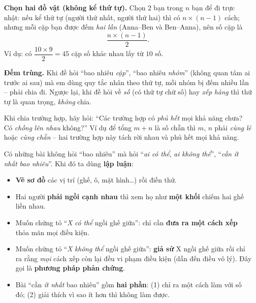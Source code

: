 \begin{knowbox}
\textbf{Chọn hai đồ vật (không kể thứ tự).} Chọn $2$ bạn trong $n$ bạn để đi trực nhật: nếu kể thứ tự (người thứ nhất, người thứ hai) thì có $n\times(n-1)$ cách; nhưng mỗi cặp bạn được đếm \emph{hai lần} (Anna--Ben và Ben--Anna), nên số cặp là
\[
\frac{n\times(n-1)}{2}.
\]
Ví dụ: có $\dfrac{10\times9}{2}=45$ cặp số khác nhau lấy từ $10$ số.
\end{knowbox}

\begin{warnbox}
\textbf{Đếm trùng.} Khi đề hỏi ``bao nhiêu \emph{cặp}'', ``bao nhiêu \emph{nhóm}'' (không quan tâm ai trước ai sau) mà em dùng quy tắc nhân theo thứ tự, mỗi nhóm bị đếm nhiều lần -- phải chia đi. Ngược lại, khi đề hỏi về \emph{số} (có thứ tự chữ số) hay \emph{xếp hàng} thì thứ tự là quan trọng, \emph{không} chia.
\end{warnbox}

\begin{tipbox}
Khi chia trường hợp, hãy hỏi: ``Các trường hợp có \emph{phủ hết} mọi khả năng chưa? Có \emph{chồng lên nhau} không?'' Ví dụ để tổng $m+n$ là số chẵn thì $m$, $n$ phải \emph{cùng lẻ} hoặc \emph{cùng chẵn} -- hai trường hợp này tách rời nhau và phủ hết mọi khả năng.
\end{tipbox}

\begin{knowbox}
Có những bài không hỏi ``bao nhiêu'' mà hỏi ``\emph{ai có thể}, \emph{ai không thể}'', ``\emph{cần ít nhất bao nhiêu}''. Khi đó ta dùng \textbf{lập luận}:
\begin{itemize}[leftmargin=1.2em,itemsep=1pt,topsep=2pt]
\item \textbf{Vẽ sơ đồ} các vị trí (ghế, ô, mặt hình\ldots) rồi điền thử.
\item Hai người \textbf{phải ngồi cạnh nhau} thì xem họ như \textbf{một khối} chiếm hai ghế liền nhau.
\item Muốn chứng tỏ ``\emph{X có thể} ngồi ghế giữa'': chỉ cần \textbf{đưa ra một cách xếp} thỏa mãn mọi điều kiện.
\item Muốn chứng tỏ ``\emph{X không thể} ngồi ghế giữa'': \textbf{giả sử} X ngồi ghế giữa rồi chỉ ra rằng \emph{mọi} cách xếp còn lại đều vi phạm điều kiện (dẫn đến điều vô lý). Đây gọi là \textbf{phương pháp phản chứng}.
\item Bài ``cần \emph{ít nhất} bao nhiêu'' gồm \textbf{hai phần}: (1) chỉ ra một cách làm với số đó; (2) giải thích vì sao ít hơn thì không làm được.
\end{itemize}
\end{knowbox}

